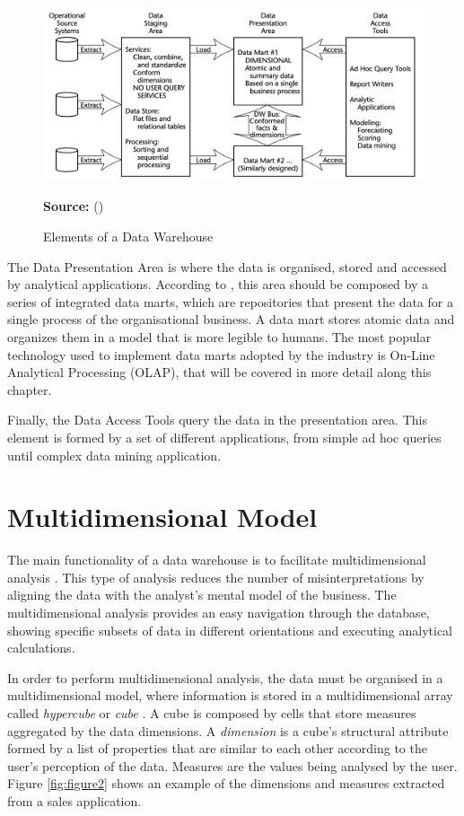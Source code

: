 \begin{figure}[ht]
\centering
\caption{Elements of a Data Warehouse}
\label{fig:figure1}
\includegraphics[width=.8\textwidth]{images/elements_data_warehouse.png}
\par\medskip\ABNTEXfontereduzida\selectfont\textbf{Source:} \citeauthor{Kimball2011} (\citeyear{Kimball2011}) \par\medskip
\end{figure}

The Data Presentation Area is where the data is organised, stored and accessed by analytical applications. According to \cite{Kimball2011}, this area should be composed by a series of integrated data marts, which are repositories that present the data for a single process of the organisational business. A data mart stores atomic data and organizes them in a model that is more legible to humans. The most popular technology used to implement data marts adopted by the industry is On-Line Analytical Processing (OLAP), that will be covered in more detail along this chapter.

Finally, the Data Access Tools query the data in the presentation area. This element is formed by a set of different applications, from simple ad hoc queries until complex data mining application.

\section{Multidimensional Model}
The main functionality of a data warehouse is to facilitate multidimensional analysis \cite{OLAPCouncil}. This type of analysis reduces the number of misinterpretations by aligning the data with the analyst's mental model of the business. The multidimensional analysis provides an easy navigation through the database, showing specific subsets of data in different orientations and executing analytical calculations.

In order to perform multidimensional analysis, the data must be organised in a multidimensional model, where information is stored in a multidimensional array called \emph{hypercube} or \emph{cube} \cite{Vassiliadis1998}. A cube is composed by cells that store measures aggregated by the data dimensions. A \emph{dimension} is a cube's structural attribute formed by a list of properties that are similar to each other according to the user's perception of the data. Measures are the values being analysed by the user. Figure \ref{fig:figure2} shows an example of the dimensions and measures extracted from a sales application.


